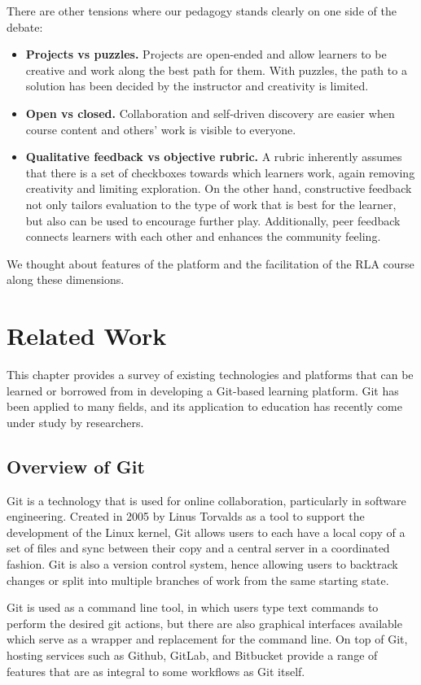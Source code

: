 \documentclass[12pt,twoside]{mitthesis}
\begin{document}
There are other tensions where our pedagogy stands clearly on one side of the debate:
\begin{itemize}
\item \textbf{Projects vs puzzles.} Projects are open-ended and allow learners to be creative and work along the best path for them. With puzzles, the path to a solution has been decided by the instructor and creativity is limited.
\item \textbf{Open vs closed.} Collaboration and self-driven discovery are easier when course content and others' work is visible to everyone.
\item \textbf{Qualitative feedback vs objective rubric.} A rubric inherently assumes that there is a set of checkboxes towards which learners work, again removing creativity and limiting exploration. On the other hand, constructive feedback not only tailors evaluation to the type of work that is best for the learner, but also can be used to encourage further play. Additionally, peer feedback connects learners with each other and enhances the community feeling.
\end{itemize}
We thought about features of the platform and the facilitation of the RLA course along these dimensions.

\chapter{Related Work}

This chapter provides a survey of existing technologies and platforms that can be learned or borrowed from in developing a Git-based learning platform. Git has been applied to many fields, and its application to education has recently come under study by researchers.

\section{Overview of Git}

Git is a technology that is used for online collaboration, particularly in software engineering. Created in 2005 by Linus Torvalds as a tool to support the development of the Linux kernel, Git allows users to each have a local copy of a set of files and sync between their copy and a central server in a coordinated fashion. Git is also a version control system, hence allowing users to backtrack changes or split into multiple branches of work from the same starting state.~\cite{githistory}

Git is used as a command line tool, in which users type text commands to perform the desired git actions, but there are also graphical interfaces available which serve as a wrapper and replacement for the command line. On top of Git, hosting services such as Github, GitLab, and Bitbucket provide a range of features that are as integral to some workflows as Git itself.~\cite{githosting}
\end{document}
